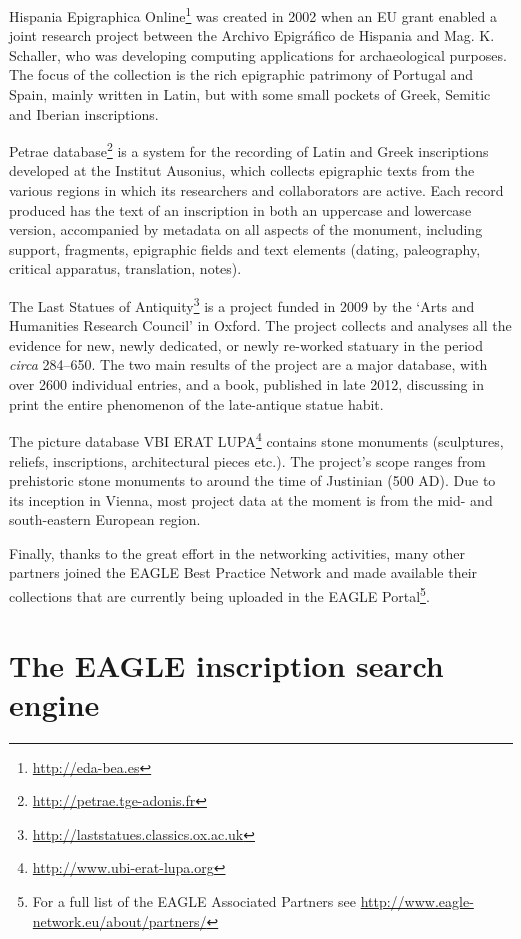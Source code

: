 \documentclass[amsthm,ebook]{saparticle}
\begin{document}
Hispania Epigraphica Online\footnote{\url{http://eda-bea.es}} was created in 2002 when an EU grant enabled a joint research
project between the Archivo Epigráfico de Hispania and Mag. K. Schaller, who was developing computing applications for
archaeological purposes. The focus of the collection is the rich epigraphic patrimony of Portugal and Spain, mainly
written in Latin, but with some small pockets of Greek, Semitic and Iberian inscriptions.

Petrae database\footnote{\url{http://petrae.tge-adonis.fr}} is a system for the recording of Latin and Greek inscriptions
developed at the Institut Ausonius, which collects epigraphic texts from the various regions in which its researchers
and collaborators are active. Each record produced has the text of an inscription in both an uppercase and lowercase
version, accompanied by metadata on all aspects of the monument, including support, fragments, epigraphic fields and
text elements (dating, paleography, critical apparatus, translation, notes).

The Last Statues of Antiquity\footnote{\url{http://laststatues.classics.ox.ac.uk}} is a project funded in 2009 by the ‘Arts
and Humanities Research Council’ in Oxford. The project collects and analyses all the evidence for new, newly
dedicated, or newly re-worked statuary in the period \textit{circa} 284–650. The two main results of the project are a major
database, with over 2600 individual entries, and a book, published in late 2012, discussing in print the entire
phenomenon of the late-antique statue habit.

The picture database VBI ERAT LUPA\footnote{\url{http://www.ubi-erat-lupa.org}} contains stone monuments (sculptures,
reliefs, inscriptions, architectural pieces etc.). The project’s scope ranges from prehistoric stone monuments to
around the time of Justinian (500 AD). Due to its inception in Vienna, most project data at the moment is from the mid-
and south-eastern European region.

Finally, thanks to the great effort in the networking activities, many other partners joined the EAGLE Best Practice
Network and made available their collections that are currently being uploaded in the EAGLE Portal\footnote{ For a full
list of the EAGLE Associated Partners see \url{http://www.eagle-network.eu/about/partners/}}. 

\section{The EAGLE inscription search engine}
\end{document}
